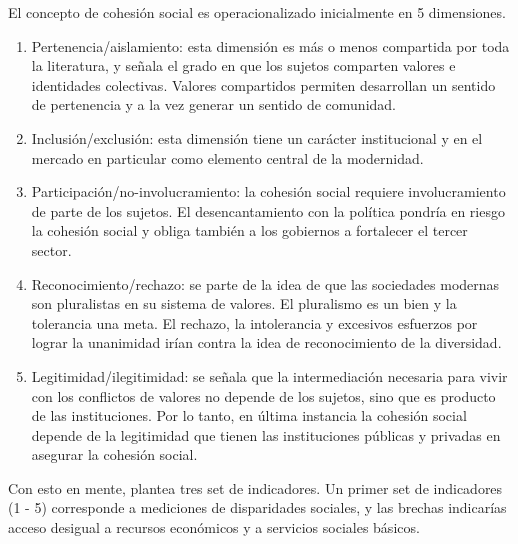 \documentclass[
  12pt,
]{book}
\begin{document}
El concepto de cohesión social es operacionalizado inicialmente en 5
dimensiones.

\begin{enumerate}
\def\labelenumi{\arabic{enumi}.}
\item
  Pertenencia/aislamiento: esta dimensión es más o menos compartida
  por toda la literatura, y señala el grado en que los sujetos
  comparten valores e identidades colectivas. Valores compartidos
  permiten desarrollan un sentido de pertenencia y a la vez generar un
  sentido de comunidad.
\item
  Inclusión/exclusión: esta dimensión tiene un carácter institucional
  y en el mercado en particular como elemento central de la
  modernidad.
\item
  Participación/no-involucramiento: la cohesión social requiere
  involucramiento de parte de los sujetos. El desencantamiento con la
  política pondría en riesgo la cohesión social y obliga también a los
  gobiernos a fortalecer el tercer sector.
\item
  Reconocimiento/rechazo: se parte de la idea de que las sociedades
  modernas son pluralistas en su sistema de valores. El pluralismo es
  un bien y la tolerancia una meta. El rechazo, la intolerancia y
  excesivos esfuerzos por lograr la unanimidad irían contra la idea de
  reconocimiento de la diversidad.
\item
  Legitimidad/ilegitimidad: se señala que la intermediación necesaria
  para vivir con los conflictos de valores no depende de los sujetos,
  sino que es producto de las instituciones. Por lo tanto, en última
  instancia la cohesión social depende de la legitimidad que tienen
  las instituciones públicas y privadas en asegurar la cohesión
  social.
\end{enumerate}

Con esto en mente, \citet{jenson2010defining} plantea tres set de indicadores.
Un primer set de indicadores (1 - 5) corresponde a mediciones de
disparidades sociales, y las brechas indicarías acceso desigual a
recursos económicos y a servicios sociales básicos.
\end{document}
